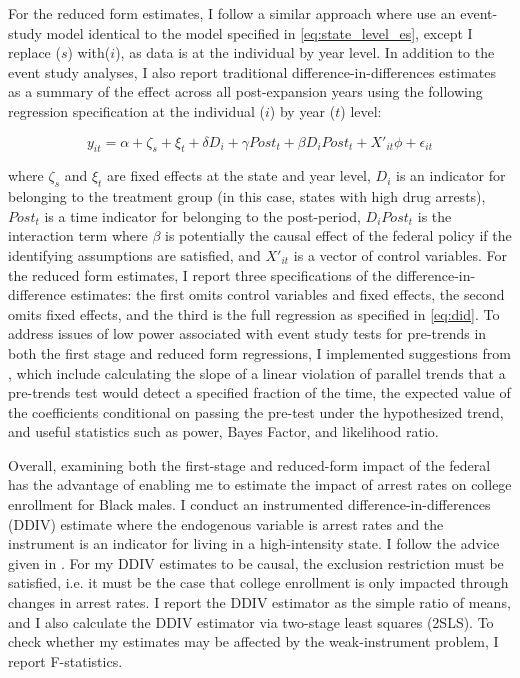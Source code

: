 \documentclass{article}
\begin{document}
For the reduced form estimates, I follow a similar approach where use an event-study model identical to the model specified in \ref{eq:state_level_es}, except I replace ($s$) with($i$), as data is at the individual by year level. In addition to the event study analyses, I also report traditional difference-in-differences estimates as a summary of the effect across all post-expansion years using the following regression specification at the individual ($i$) by year ($t$) level: 

\begin{equation} \label{eq:did}
  y_{it} = \alpha + \zeta_s + \xi_t + \delta D_i + \gamma Post_t + \beta D_i Post_t + X'_{it}\phi + \epsilon_{it}
\end{equation}

where $\zeta_s$ and $\xi_t$ are fixed effects at the state and year level, $D_{i}$ is an indicator for belonging to the treatment group (in this case, states with high drug arrests), $Post_t$ is a time indicator for belonging to the post-period, $D_i Post_t$ is the interaction term where $\beta$ is potentially the causal effect of the federal policy if the identifying assumptions are satisfied, and $X'_{it}$ is a vector of control variables. For the reduced form estimates, I report three specifications of the difference-in-difference estimates: the first omits control variables and fixed effects, the second omits fixed effects, and the third is the full regression as specified in \ref{eq:did}. To address issues of low power associated with event study tests for pre-trends in both the first stage and reduced form regressions, I implemented suggestions from \cite{roth2022}, which include calculating the slope of a linear violation of parallel trends that a pre-trends test would detect a specified fraction of the time, the expected value of the coefficients conditional on passing the pre-test under the hypothesized trend, and useful statistics such as power, Bayes Factor, and likelihood ratio.

Overall, examining both the first-stage and reduced-form impact of the federal has the advantage of enabling me to estimate the impact of arrest rates on college enrollment for Black males. I conduct an instrumented difference-in-differences (DDIV) estimate where the endogenous variable is arrest rates and the instrument is an indicator for living in a high-intensity state. I follow the advice given in \cite{ddiv}. For my DDIV estimates to be causal, the exclusion restriction must be satisfied, i.e. it must be the case that college enrollment is only impacted through changes in arrest rates.  I report the DDIV estimator as the simple ratio of means, and I also calculate the DDIV estimator via two-stage least squares (2SLS). To check whether my estimates may be affected by the weak-instrument problem, I report F-statistics.
\end{document}
